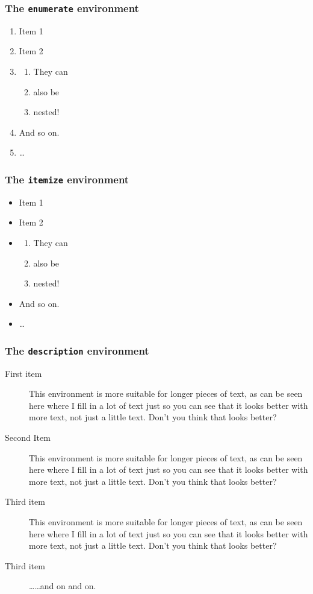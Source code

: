 \documentclass[a4paper, 11pt]{article} %
\begin{document}
\subsubsection{The \texttt{enumerate} environment}

\begin{enumerate}
	\item Item 1
	\item Item 2
	\item \begin{enumerate}
			\item They can
			\item also be 
			\item nested!
	       \end{enumerate}
	\item And so on.
	\item \ldots
\end{enumerate}


\subsubsection{The \texttt{itemize} environment}

\begin{itemize}
	\item Item 1
	\item Item 2
	\item \begin{enumerate}
			\item They can
			\item also be 
			\item nested!
		\end{enumerate}
	\item And so on.
	\item \ldots
\end{itemize}


\subsubsection{The \texttt{description} environment}

\begin{description}
	\item[First item] This environment is more suitable for longer pieces
		of text, as can be seen here where I fill in a lot of text just
		so you can see that it looks better with more text, not just a
		little text. Don't you think that looks better?
	\item[Second Item] This environment is more suitable for longer pieces
		of text, as can be seen here where I fill in a lot of text just
		so you can see that it looks better with more text, not just a
		little text. Don't you think that looks better?
	\item[Third item] This environment is more suitable for longer pieces
		of text, as can be seen here where I fill in a lot of text just
		so you can see that it looks better with more text, not just a
		little text. Don't you think that looks better?
	\item[Third item] \ldots \ldots and on and on.
\end{description}
\end{document}

